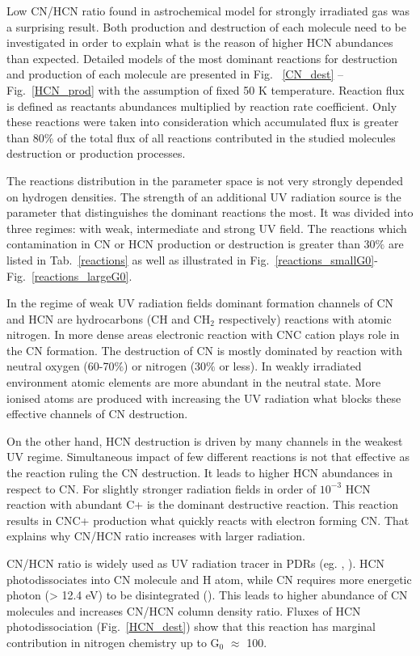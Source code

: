 \documentclass{aa}
\begin{document}
Low CN/HCN ratio found in astrochemical model for strongly irradiated gas was a surprising result. Both production and destruction of each molecule need to be investigated in order to explain what is the reason of higher HCN abundances than expected. Detailed models of the most dominant reactions for destruction and production of each molecule are presented in Fig. ~\ref{CN_dest} – Fig.~\ref{HCN_prod} with the assumption of fixed 50 K temperature. Reaction flux is defined as reactants abundances multiplied by reaction rate coefficient. Only these reactions were taken into consideration which accumulated flux is greater than 80$\%$ of the total flux of all reactions contributed in the studied molecules destruction or production processes. 

The reactions distribution in the parameter space is not very strongly depended on hydrogen densities. The strength of an additional UV radiation source is the parameter that distinguishes the dominant reactions the most. It was divided into three regimes: with weak, intermediate and strong UV field. The reactions which contamination in CN or HCN production or destruction is greater than 30$\%$ are listed in Tab.~\ref{reactions} as well as illustrated in Fig.~\ref{reactions_smallG0}- Fig.~\ref{reactions_largeG0}.

In the regime of weak UV radiation fields dominant formation channels of CN and HCN are hydrocarbons (CH and CH$_2$ respectively) reactions with atomic nitrogen. In more dense areas electronic reaction with CNC cation plays role in the CN formation. The destruction of CN is mostly dominated by reaction with neutral oxygen (60-70$\%$) or nitrogen (30$\%$ or less). In weakly irradiated environment atomic elements are more abundant in the neutral state. More ionised atoms are produced with increasing the UV radiation what blocks these effective channels of CN destruction. 

On the other hand, HCN destruction is driven by many channels in the weakest UV regime. Simultaneous impact of few different reactions is not that effective as the reaction ruling the CN destruction. It leads to higher HCN abundances in respect to CN. For slightly stronger radiation fields in order of $10^{-3}$ HCN reaction with abundant C+ is the dominant destructive reaction. This reaction results in CNC+ production what quickly reacts with electron forming CN. That explains why CN/HCN ratio increases with larger radiation. 

CN/HCN ratio is widely used as UV radiation tracer in PDRs (eg. \citealt{Thi04}, \citealt{Han15}). HCN photodissociates into CN molecule and H atom, while CN requires more energetic photon (> 12.4 eV) to be disintegrated (\citealt{vDi87}). This leads to higher abundance of CN molecules and increases CN/HCN column density ratio. Fluxes of HCN photodissociation (Fig.~\ref{HCN_dest}) show that this reaction has marginal contribution in nitrogen chemistry up to G$_0$ $\approx$ 100.
\end{document}
